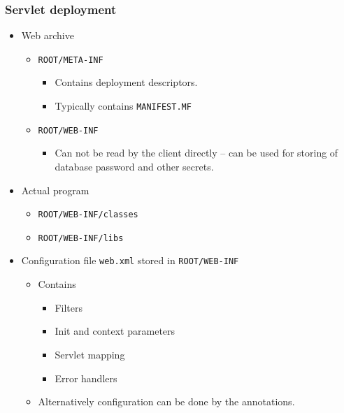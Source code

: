\documentclass[10pt,xcolor=pdflatex]{beamer}
\begin{document}
\begin{frame}\frametitle{Servlet deployment}
   	\begin{itemize}
       	\item Web archive
          \begin{itemize}
         	\item \texttt{ROOT/META-INF}
              \begin{itemize}
                \item Contains deployment descriptors.
                \item Typically contains \texttt{MANIFEST.MF}
               \end{itemize}
			 \item \texttt{ROOT/WEB-INF}
               \begin{itemize}
                 \item Can not be read by the client directly -- can be used for storing of database password and other secrets.
               \end{itemize}
          \end{itemize}
        \item Actual program
           \begin{itemize}
             \item \texttt{ROOT/WEB-INF/classes}
			 \item \texttt{ROOT/WEB-INF/libs}
           \end{itemize}
        \item Configuration file \texttt{web.xml} stored in \texttt{ROOT/WEB-INF}
          \begin{itemize}
            \item Contains
              \begin{itemize}
			    \item Filters
			    \item Init and context parameters
			    \item Servlet mapping
			    \item Error handlers
              \end{itemize}
        \item Alternatively configuration can be done by the annotations.
      \end{itemize}
    \end{itemize}
\end{frame}
\end{document}
